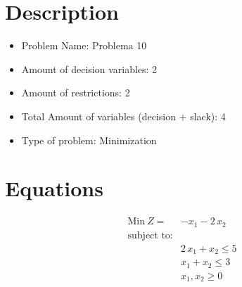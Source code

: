\section*{Description}
\begin{itemize}
\item Problem Name: Problema 10
\item Amount of decision variables: 2
\item Amount of restrictions: 2
\item Total Amount of variables (decision + slack): 4
\item Type of problem: Minimization
\end{itemize}
\section*{Equations}
\begin{align*}
\text{Min}\ Z = {} & -x_{1} - 2\,x_{2} \\ 
\text{subject to:} & \\ 
& 2\,x_{1} + x_{2} \leq 5 \\ 
& x_{1} + x_{2} \leq 3 \\ 
& x_{1}, x_{2} \geq 0 
\end{align*}

